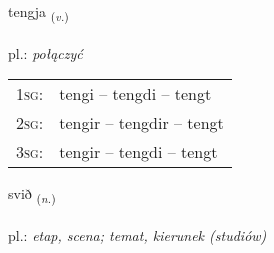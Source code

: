 \documentclass[frontgrid, backgrid]{flacards}\usepackage[]{graphicx}\usepackage[]{xcolor}
\begin{document}
\renewcommand{\blhead}{\vskip5pt {\small\bfseries\footnotesize Sagnorð | czasownik }}
\renewcommand{\bcfoot}{\vskip5pt \hspace{2pt}{\small\bfseries\footnotesize 1K}}


{tengja \small{\textsubscript{(\textit{v.})}} \\[1ex] %
\textphonetic{[tʰeiɲca]} \\
pl.: \emph{połączyć} \\  [2ex]
\renewcommand*{\arraystretch}{0.8}
\begin{tabular}{p{1cm}l}
\textsc{1sg}: & tengi -- tengdi -- tengt \\ 
\textsc{2sg}: & tengir -- tengdir -- tengt \\ 
\textsc{3sg}: & tengir -- tengdi -- tengt \\ 
\end{tabular}
}

\renewcommand{\flhead}{\vskip5pt \fboxsep=0pt {\small\bfseries\footnotesize Nafnorð | rzeczownik}}
\renewcommand{\fcfoot}{\vskip5pt \fboxsep=0pt \hspace{2pt}{\small\bfseries\footnotesize 1K}}

\renewcommand{\blhead}{\vskip5pt {\small\bfseries\footnotesize Nafnorð | rzeczownik }}
\renewcommand{\bcfoot}{\vskip5pt \hspace{2pt}{\small\bfseries\footnotesize 1K}}


{svið \small{\textsubscript{(\textit{n.})}} \\[1ex] %
\textphonetic{[svɪːð]} \\
pl.: \emph{etap, scena; temat, kierunek (studiów)} \\  [2ex]
\renewcommand*{\arraystretch}{0.8}
}
\end{document}
